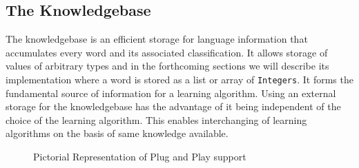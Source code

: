 \subsection{The Knowledgebase}

	The knowledgebase is an efficient storage for language information that accumulates every word and its associated classification. It allows storage of values of arbitrary types and in the forthcoming sections we will describe its implementation where a word is stored as a list or array of \texttt{Integers}.
	It forms the fundamental source of information for a learning algorithm. Using an external storage for the knowledgebase has the advantage of it being independent of the choice of the learning algorithm. This enables interchanging of learning algorithms on the basis of same knowledge available. 
	
\begin{figure}[h]
	\centering
	\caption{Pictorial Representation of Plug and Play support}
	\label{fig:plug}
\end{figure}

